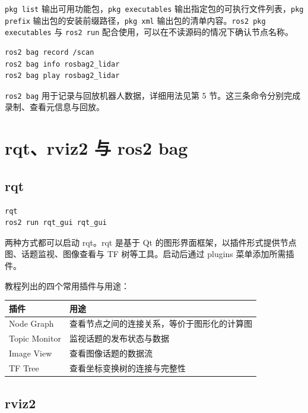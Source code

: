 \passthrough{\lstinline!pkg list!}
输出可用功能包，\passthrough{\lstinline!pkg executables!}
输出指定包的可执行文件列表，\passthrough{\lstinline!pkg prefix!}
输出包的安装前缀路径，\passthrough{\lstinline!pkg xml!}
输出包的清单内容。\passthrough{\lstinline!ros2 pkg executables!} 与
\passthrough{\lstinline!ros2 run!}
配合使用，可以在不读源码的情况下确认节点名称。

\begin{lstlisting}[language=bash]
ros2 bag record /scan
ros2 bag info rosbag2_lidar
ros2 bag play rosbag2_lidar
\end{lstlisting}

\passthrough{\lstinline!ros2 bag!}
用于记录与回放机器人数据，详细用法见第 5
节。这三条命令分别完成录制、查看元信息与回放。

\section{rqt、rviz2 与 ros2 bag}\label{rqtrviz2-ux4e0e-ros2-bag}

\subsection{rqt}\label{rqt}

\begin{lstlisting}[language=bash]
rqt
ros2 run rqt_gui rqt_gui
\end{lstlisting}

两种方式都可以启动 rqt。rqt 是基于 Qt
的图形界面框架，以插件形式提供节点图、话题监视、图像查看与 TF
树等工具。启动后通过 plugins 菜单添加所需插件。

教程列出的四个常用插件与用途：

\begin{longtable}[]{@{}ll@{}}
\toprule\noalign{}
插件 & 用途 \\
\midrule\noalign{}
\endhead
\bottomrule\noalign{}
\endlastfoot
Node Graph & 查看节点之间的连接关系，等价于图形化的计算图 \\
Topic Monitor & 监视话题的发布状态与数据 \\
Image View & 查看图像话题的数据流 \\
TF Tree & 查看坐标变换树的连接与完整性 \\
\end{longtable}

\subsection{rviz2}\label{rviz2}

